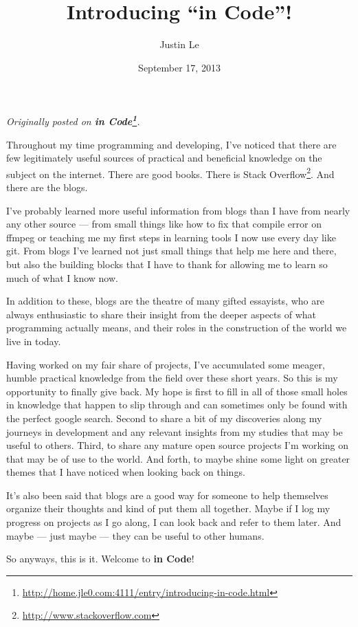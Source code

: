 \documentclass[]{article}
\title{Introducing ``in Code''!}
\author{Justin Le}
\date{September 17, 2013}
\renewcommand{\href}[2]{#2\footnote{\url{#1}}}
\begin{document}
\maketitle

\emph{Originally posted on
\textbf{\href{http://home.jle0.com:4111/entry/introducing-in-code.html}{in
Code}}.}

Throughout my time programming and developing, I've noticed that there
are few legitimately useful sources of practical and beneficial
knowledge on the subject on the internet. There are good books. There is
\href{http://www.stackoverflow.com}{Stack Overflow}. And there are the
blogs.

I've probably learned more useful information from blogs than I have
from nearly any other source --- from small things like how to fix that
compile error on ffmpeg or teaching me my first steps in learning tools
I now use every day like git. From blogs I've learned not just small
things that help me here and there, but also the building blocks that I
have to thank for allowing me to learn so much of what I know now.

In addition to these, blogs are the theatre of many gifted essayists,
who are always enthusiastic to share their insight from the deeper
aspects of what programming actually means, and their roles in the
construction of the world we live in today.

Having worked on my fair share of projects, I've accumulated some
meager, humble practical knowledge from the field over these short
years. So this is my opportunity to finally give back. My hope is first
to fill in all of those small holes in knowledge that happen to slip
through and can sometimes only be found with the perfect google search.
Second to share a bit of my discoveries along my journeys in development
and any relevant insights from my studies that may be useful to others.
Third, to share any mature open source projects I'm working on that may
be of use to the world. And forth, to maybe shine some light on greater
themes that I have noticed when looking back on things.

It's also been said that blogs are a good way for someone to help
themselves organize their thoughts and kind of put them all together.
Maybe if I log my progress on projects as I go along, I can look back
and refer to them later. And maybe --- just maybe --- they can be useful
to other humans.

So anyways, this is it. Welcome to \textbf{in Code}!
\end{document}
